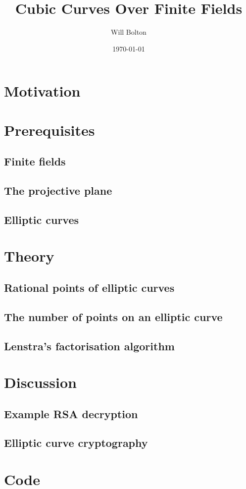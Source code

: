 \documentclass[a4paper,12pt,titlepage,oneside]{article}
\title{Cubic Curves Over Finite Fields}
\author{Will Bolton}
\date{\today}
\begin{document}
\maketitle
\tableofcontents
\clearpage

\section*{Motivation}

\nocite{*}
\clearpage

\section{Prerequisites}
\subsection{Finite fields}

\subsection{The projective plane}

\subsection{Elliptic curves}

\clearpage

\section{Theory}
\subsection{Rational points of elliptic curves}

\subsection{The number of points on an elliptic curve}

\subsection{Lenstra's factorisation algorithm}

\clearpage

\section{Discussion}
\subsection{Example RSA decryption}

\subsection{Elliptic curve cryptography}

\clearpage

\appendix
\section{Code}
\label{codeappendix}

\clearpage


\end{document}
